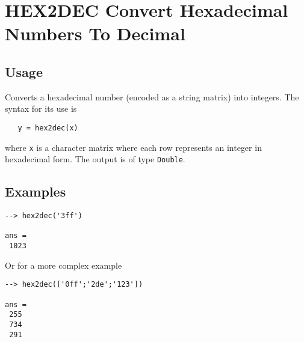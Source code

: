 \section{HEX2DEC Convert Hexadecimal Numbers To Decimal}

\subsection{Usage}

Converts a hexadecimal number (encoded as a string matrix) into integers.
The syntax for its use is
\begin{verbatim}
   y = hex2dec(x)
\end{verbatim}
where \verb|x| is a character matrix where each row represents an integer
in hexadecimal form.  The output is of type \verb|Double|.
\subsection{Examples}

\begin{verbatim}
--> hex2dec('3ff')

ans = 
 1023 
\end{verbatim}
Or for a more complex example
\begin{verbatim}
--> hex2dec(['0ff';'2de';'123'])

ans = 
 255 
 734 
 291 
\end{verbatim}
